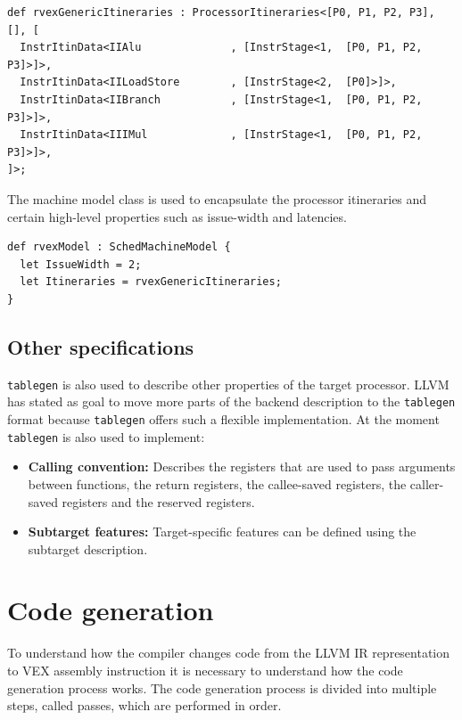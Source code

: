 \begin{lstlisting}[language=tblgen]
def rvexGenericItineraries : ProcessorItineraries<[P0, P1, P2, P3], [], [
  InstrItinData<IIAlu              , [InstrStage<1,  [P0, P1, P2, P3]>]>,
  InstrItinData<IILoadStore        , [InstrStage<2,  [P0]>]>,
  InstrItinData<IIBranch           , [InstrStage<1,  [P0, P1, P2, P3]>]>,
  InstrItinData<IIIMul             , [InstrStage<1,  [P0, P1, P2, P3]>]>,
]>;
\end{lstlisting}

The machine model class is used to encapsulate the processor itineraries and certain high-level properties such as issue-width and latencies.

\begin{lstlisting}[language=tblgen]
def rvexModel : SchedMachineModel {
  let IssueWidth = 2;
  let Itineraries = rvexGenericItineraries;
}
\end{lstlisting}

\subsection{Other specifications}
\texttt{tablegen} is also used to describe other properties of the target processor. LLVM has stated as goal to move more parts of the backend description to the \texttt{tablegen} format because \texttt{tablegen} offers such a flexible implementation. At the moment \texttt{tablegen} is also used to implement:

\begin{itemize}
  \item \textbf{Calling convention:} Describes the registers that are used to pass arguments between functions, the return registers, the callee-saved registers, the caller-saved registers and the reserved registers. 
  \item \textbf{Subtarget features:} Target-specific features can be defined using the subtarget description. 
\end{itemize}

\section{Code generation}
To understand how the compiler changes code from the LLVM IR representation to VEX assembly instruction it is necessary to understand how the code generation process works. The code generation process is divided into multiple steps, called passes, which are performed in order. 

